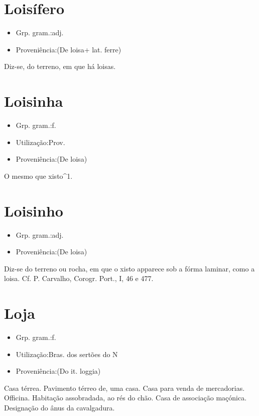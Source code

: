 \section{Loisífero}
\begin{itemize}
\item {Grp. gram.:adj.}
\end{itemize}
\begin{itemize}
\item {Proveniência:(De \textunderscore loisa\textunderscore  + lat. \textunderscore ferre\textunderscore )}
\end{itemize}
Diz-se, do terreno, em que há loisas.
\section{Loisinha}
\begin{itemize}
\item {Grp. gram.:f.}
\end{itemize}
\begin{itemize}
\item {Utilização:Prov.}
\end{itemize}
\begin{itemize}
\item {Proveniência:(De \textunderscore loisa\textunderscore )}
\end{itemize}
O mesmo que \textunderscore xisto\textunderscore ^1.
\section{Loisinho}
\begin{itemize}
\item {Grp. gram.:adj.}
\end{itemize}
\begin{itemize}
\item {Proveniência:(De \textunderscore loisa\textunderscore )}
\end{itemize}
Diz-se do terreno ou rocha, em que o xisto apparece sob a fórma laminar, como a loisa. Cf. P. Carvalho, \textunderscore Corogr. Port.\textunderscore , I, 46 e 477.
\section{Loja}
\begin{itemize}
\item {Grp. gram.:f.}
\end{itemize}
\begin{itemize}
\item {Utilização:Bras. dos sertões do N}
\end{itemize}
\begin{itemize}
\item {Proveniência:(Do it. \textunderscore loggia\textunderscore )}
\end{itemize}
Casa térrea.
Pavimento térreo de, uma casa.
Casa para venda de mercadorias.
Officina.
Habitação assobradada, ao rés do chão.
Casa de associação maçónica.
Designação do ânus da cavalgadura.
